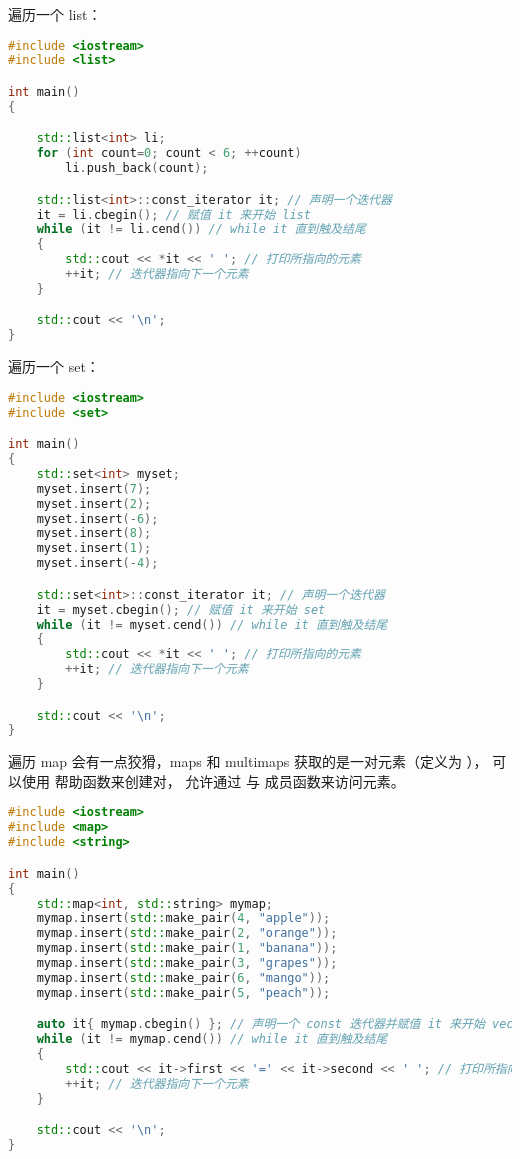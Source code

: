 \documentclass[../../LearnCpp.tex]{subfiles}
\begin{document}
遍历一个 list：

\begin{lstlisting}[language=C++]
#include <iostream>
#include <list>

int main()
{

    std::list<int> li;
    for (int count=0; count < 6; ++count)
        li.push_back(count);

    std::list<int>::const_iterator it; // 声明一个迭代器
    it = li.cbegin(); // 赋值 it 来开始 list
    while (it != li.cend()) // while it 直到触及结尾
    {
        std::cout << *it << ' '; // 打印所指向的元素
        ++it; // 迭代器指向下一个元素
    }

    std::cout << '\n';
}
\end{lstlisting}

遍历一个 set：

\begin{lstlisting}[language=C++]
#include <iostream>
#include <set>

int main()
{
    std::set<int> myset;
    myset.insert(7);
    myset.insert(2);
    myset.insert(-6);
    myset.insert(8);
    myset.insert(1);
    myset.insert(-4);

    std::set<int>::const_iterator it; // 声明一个迭代器
    it = myset.cbegin(); // 赋值 it 来开始 set
    while (it != myset.cend()) // while it 直到触及结尾
    {
        std::cout << *it << ' '; // 打印所指向的元素
        ++it; // 迭代器指向下一个元素
    }

    std::cout << '\n';
}
\end{lstlisting}

遍历 map 会有一点狡猾，maps 和 multimaps 获取的是一对元素（定义为 ），
可以使用  帮助函数来创建对，
 允许通过  与  成员函数来访问元素。

\begin{lstlisting}[language=C++]
#include <iostream>
#include <map>
#include <string>

int main()
{
    std::map<int, std::string> mymap;
    mymap.insert(std::make_pair(4, "apple"));
    mymap.insert(std::make_pair(2, "orange"));
    mymap.insert(std::make_pair(1, "banana"));
    mymap.insert(std::make_pair(3, "grapes"));
    mymap.insert(std::make_pair(6, "mango"));
    mymap.insert(std::make_pair(5, "peach"));

    auto it{ mymap.cbegin() }; // 声明一个 const 迭代器并赋值 it 来开始 vector
    while (it != mymap.cend()) // while it 直到触及结尾
    {
        std::cout << it->first << '=' << it->second << ' '; // 打印所指向的元素
        ++it; // 迭代器指向下一个元素
    }

    std::cout << '\n';
}
\end{lstlisting}
\end{document}
